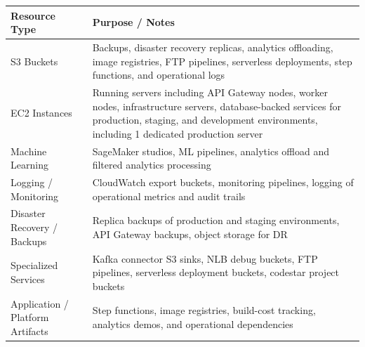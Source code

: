 \documentclass[12pt,a4paper]{report}
\begin{document}
\begin{table}[h!]
	\centering
	\begin{tabular}{|l|p{10cm}|}
		\hline
		\textbf{Resource Type}           & \textbf{Purpose / Notes}                                                                                                                                                                                   \\ \hline

		S3 Buckets                       & Backups, disaster recovery replicas, analytics offloading, image registries, FTP pipelines, serverless deployments, step functions, and operational logs                                                   \\ \hline

		EC2 Instances                    & Running servers including API Gateway nodes, worker nodes, infrastructure servers, database-backed services for production, staging, and development environments, including 1 dedicated production server \\ \hline

		Machine Learning                 & SageMaker studios, ML pipelines, analytics offload and filtered analytics processing                                                                                                                       \\ \hline

		Logging / Monitoring             & CloudWatch export buckets, monitoring pipelines, logging of operational metrics and audit trails                                                                                                           \\ \hline

		Disaster Recovery / Backups      & Replica backups of production and staging environments, API Gateway backups, object storage for DR                                                                                                         \\ \hline

		Specialized Services             & Kafka connector S3 sinks, NLB debug buckets, FTP pipelines, serverless deployment buckets, codestar project buckets                                                                                        \\ \hline

		Application / Platform Artifacts & Step functions, image registries, build-cost tracking, analytics demos, and operational dependencies                                                                                                       \\ \hline
	\end{tabular}
\end{table}
\end{document}
